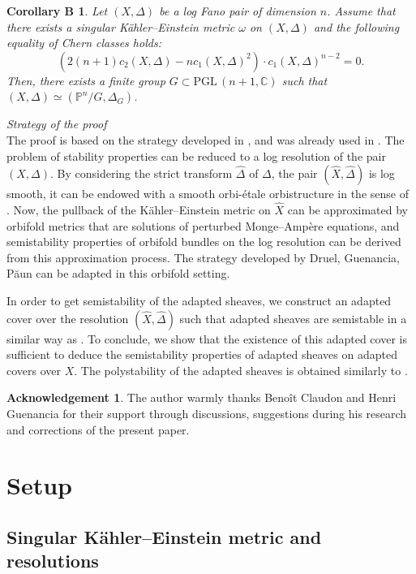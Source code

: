 \documentclass[12pt,a4paper]{amsart}
\newcommand{\C}{\mathbb{C}}
\newcommand{\PP}{\mathbb{P}}
\newcommand{\PGL}{\mathrm{PGL}\,}
\theoremstyle{plain}
\newtheorem*{coroB}{Corollary B}
\theoremstyle{definition}
\newtheorem*{ackn}{Acknowledgement}
\begin{document}
\begin{coroB}
	Let $(X, \Delta)$ be a log Fano pair of dimension $n$. Assume that there exists a singular K\"ahler--Einstein metric $\omega$ on $(X, \Delta)$ and the following equality of Chern classes holds:
	$$
	\left( 2(n+1)c_2(X, \Delta) - nc_1(X, \Delta)^2 \right) \cdot c_1(X, \Delta)^{n-2} = 0.
	$$
	Then, there exists a finite group $G \subset \PGL(n+1, \C)$ such that $(X, \Delta) \simeq (\PP^n / G, \Delta_G)$.
\end{coroB}

\emph{Strategy of the proof}\\
	The proof is based on the strategy developed in \cite{DGP24}, and was already used in \cite{Eno88, Gue16, GT22}. The problem of stability properties can be reduced to a log resolution of the pair $(X, \Delta)$. By considering the strict transform $\widehat{\Delta}$ of $\Delta$, the pair $(\widehat{X}, \widehat{\Delta})$ is log smooth, it can be endowed with a smooth orbi-\'etale orbistructure in the sense of \cite{GT22}. Now, the pullback of the K\"ahler--Einstein metric on $\widehat{X}$ can be approximated by orbifold metrics that are solutions of perturbed Monge--Ampère equations, and semistability properties of orbifold bundles on the log resolution can be derived from this approximation process. The strategy developed by Druel, Guenancia, P\u{a}un can be adapted in this orbifold setting.
	
	In order to get semistability of the adapted sheaves, we construct an adapted cover over the resolution $(\widehat{X}, \widehat{\Delta})$ such that adapted sheaves are semistable in a similar way as \cite{GT22}. To conclude, we show that the existence of this adapted cover is sufficient to deduce the semistability properties of adapted sheaves on adapted covers over $X$. The polystability of the adapted sheaves is obtained similarly to \cite{DGP24}. 
	
\begin{ackn} 
    The author warmly thanks Benoît Claudon and Henri Guenancia for their support through discussions, suggestions during his research and corrections of the present paper.
\end{ackn}
	
 

\section{Setup}

\subsection{Singular K\"ahler--Einstein metric and resolutions}
\end{document}
